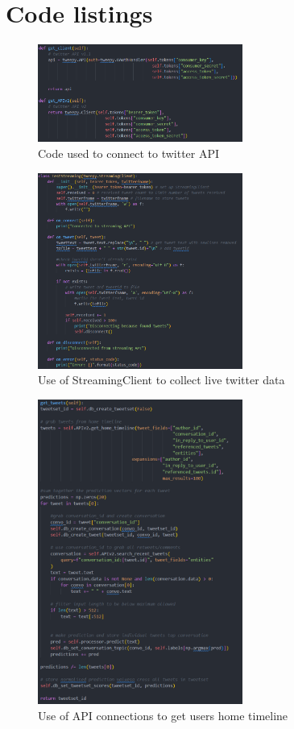 \chapter{Code listings}\label{app:code}
\begin{figure}
    \centering
    \includegraphics[width=0.6\textwidth]{../images/setup-api-conn.png}
    \caption{Code used to connect to twitter API}
    \label{fig:tweepy-conn}
\end{figure}
\begin{figure}
    \centering
    \includegraphics[width=0.6\textwidth]{../images/streamingclient.png}
    \caption{Use of StreamingClient to collect live twitter data}
    \label{fig:live-data}
\end{figure}
\begin{figure}
    \centering
    \includegraphics[width=0.6\textwidth]{../images/get_home_timeline.png}
    \caption{Use of API connections to get users home timeline}
    \label{fig:user-data}
\end{figure}